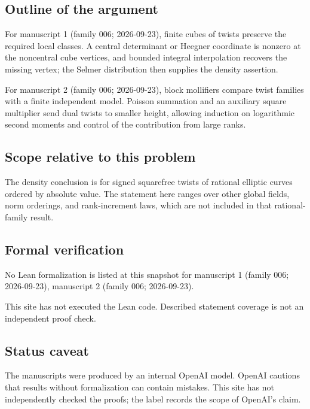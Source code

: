\documentclass[11pt]{article}
\begin{document}
\subsection{Outline of the argument}
For manuscript 1 (family 006; 2026-09-23), finite cubes of twists preserve the required local classes. A central determinant or Heegner coordinate is nonzero at the noncentral cube vertices, and bounded integral interpolation recovers the missing vertex; the Selmer distribution then supplies the density assertion.

For manuscript 2 (family 006; 2026-09-23), block mollifiers compare twist families with a finite independent model. Poisson summation and an auxiliary square multiplier send dual twists to smaller height, allowing induction on logarithmic second moments and control of the contribution from large ranks.

\subsection{Scope relative to this problem}
The density conclusion is for signed squarefree twists of rational elliptic curves ordered by absolute value. The statement here ranges over other global fields, norm orderings, and rank-increment laws, which are not included in that rational-family result.

\subsection{Formal verification}
No Lean formalization is listed at this snapshot for manuscript 1 (family 006; 2026-09-23), manuscript 2 (family 006; 2026-09-23).

This site has not executed the Lean code. Described statement coverage is not an independent proof check.

\subsection{Status caveat}
The manuscripts were produced by an internal OpenAI model. OpenAI cautions that results without formalization can contain mistakes. This site has not independently checked the proofs; the label records the scope of OpenAI's claim.
\end{document}
